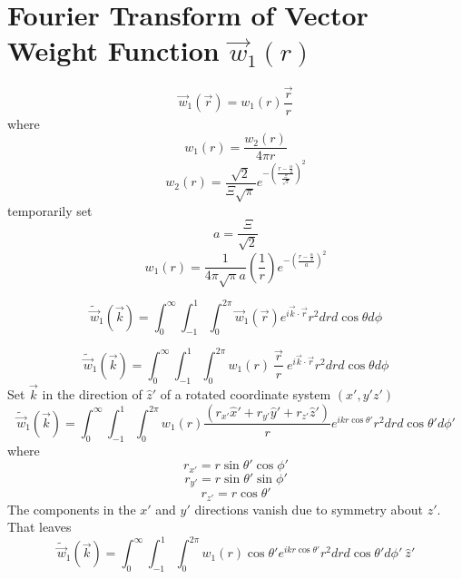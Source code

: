 \documentclass[double,12pt]{beavtex}
\begin{document}
\section{Fourier Transform of Vector Weight Function $\vec{w}_{1}(r)$}
\begin{equation}{\vec{w}_1(\vec{r})=w_1(r)\frac{\vec{r}}{r}}\end{equation}
where
\begin{equation}{w_1(r)=\frac{w_2(r)}{4{\pi}r}}\end{equation}
\begin{equation}{w_2(r)=\frac{\sqrt{2}}{\Xi\sqrt{\pi}}e^{-\left(\frac{r-\frac{\alpha}{2}}{\frac{\Xi}{\sqrt{2}}}\right)^2}}\end{equation}
temporarily set 
\begin{equation}{a=\frac{\Xi}{\sqrt{2}}}\end{equation}
\begin{equation}{w_1(r)=\frac{1}{4{\pi}\sqrt{\pi}a}\left(\frac{1}{r}\right)e^{-\left(\frac{r-\frac{\alpha}{2}}{a}\right)^2}}\end{equation}

\begin{equation}{\widetilde{\vec{w}}_1(\vec{k})=\int_{0}^{\infty}\int_{-1}^{1}\int_{0}^{2\pi}\vec{w}_1(\vec{r})e^{i\vec{k}\cdot{\vec{r}}}r^2d{r}d{\cos\theta}d{\phi}}\end{equation}

\begin{equation}{\widetilde{\vec{w}}_1(\vec{k})=\int_{0}^{\infty}\int_{-1}^{1}\int_{0}^{2\pi}w_1(r){~}\frac{\vec{r}}{r}{~}e^{i\vec{k}\cdot{\vec{r}}}r^2d{r}d{\cos\theta}d{\phi}}\end{equation}
Set $\vec{k}$ in the direction of $\hat{z}'$ of a rotated 
coordinate system $(x',y'z')$ 
\begin{equation}{\widetilde{\vec{w}}_1(\vec{k})=\int_{0}^{\infty}\int_{-1}^{1}\int_{0}^{2\pi}w_1(r)\frac{(r_{x'}\hat{x}'+r_{y'}\hat{y}'+r_{z'}\hat{z}')}{r}e^{ikr\cos\theta'}r^2d{r}d{\cos\theta'}d{\phi'}}\end{equation}
where
\begin{displaymath}{r_{x'}=r\sin\theta'\cos\phi'}\end{displaymath}
\begin{displaymath}{r_{y'}=r\sin\theta'\sin\phi'}\end{displaymath}
\begin{displaymath}{r_{z'}=r\cos\theta'}\end{displaymath} 
The components in the $x'$ and $y'$ directions vanish due to symmetry 
about $z'$. That leaves
\begin{equation}{\widetilde{\vec{w}}_1(\vec{k})=\int_{0}^{\infty}\int_{-1}^{1}\int_{0}^{2\pi}w_1(r)\cos{\theta}'e^{ikr\cos\theta'}r^2d{r}d{\cos\theta'}d{\phi'}{~}\hat{z}'}\end{equation}
\end{document}
